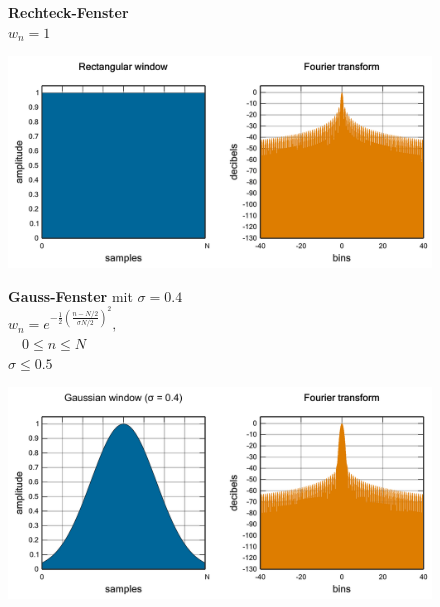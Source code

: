 \begin{figure}[!ht]
	\begin{minipage}{.4\columnwidth}
		\textbf{Rechteck-Fenster}\\
		$w_{n}=1$
	\end{minipage}%
	\begin{minipage}{.6\columnwidth}
		\centering
		\includegraphics[width=\linewidth]{papers/autotune/sections/fft/images/windows/Rectangular.pdf}
	\end{minipage}


	\begin{minipage}{.4\columnwidth}
		\textbf{Gauss-Fenster} mit $\sigma = 0.4$\\
		$w_{n}=e^{-\frac{1}{2}\left(\frac{n-N / 2}{\sigma N / 2}\right)^{2}},$\\
		$ \quad 0 \leq n \leq N$\\
		$\sigma \leq 0.5$
	\end{minipage}%
	\begin{minipage}{.6\columnwidth}
		\centering
		\includegraphics[width=\linewidth]{papers/autotune/sections/fft/images/windows/Gauss.pdf}
	\end{minipage}



\end{figure}
